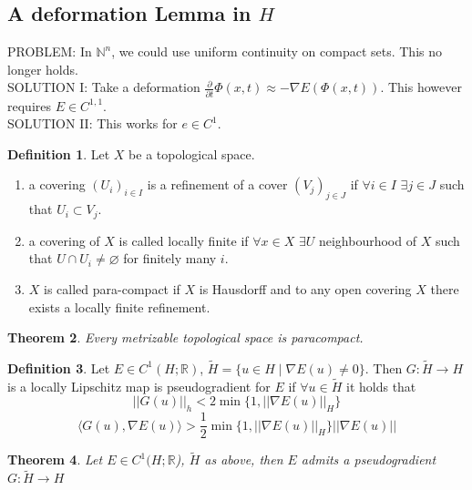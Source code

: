 \documentclass[a4paper, 12pt]{article}
\theoremstyle{plain}
\newtheorem{theorem}{Theorem}[section] %
\theoremstyle{definition}
\newtheorem{definition}[theorem]{Definition} %
\theoremstyle{lemma}
\theoremstyle{remark}
\theoremstyle{corollary}
\theoremstyle{example}
\begin{document}
	\subsection{A deformation Lemma in $H$}
	PROBLEM: In $\mathbb{N}^n$, we could use uniform continuity on compact sets. This no longer holds.\\
	SOLUTION I: Take a deformation $\frac{\partial}{\partial t} \Phi(x,t) \approx -\nabla E(\Phi(x,t))$. This however requires $E \in C^{1,1}$.\\
	SOLUTION II: This works for $e \in C^1$. 
	\begin{definition}
		Let $X$ be a topological space. \begin{enumerate}
			\item a covering $(U_i)_{i \in I}$ is a refinement of a cover $(V_j)_{j \in J}$ if $\forall i \in I$ $\exists j \in J$ such that $U_i \subset V_j$.
			\item a covering of $X$ is called locally finite if $\forall x \in X$ $\exists U$ neighbourhood of $X$ such that $U \cap U_i \neq \varnothing$ for finitely many $i$.
			\item $X$ is called para-compact if $X$ is Hausdorff and to any open covering $X$ there exists a locally finite refinement.
		\end{enumerate}
	\end{definition}
	\begin{theorem}
		Every metrizable topological space is paracompact.
	\end{theorem}
	\begin{definition}
		Let $E \in C^1(H;\mathbb{R})$, $\tilde{H} = \{u \in H \mid \nabla E(u) \neq 0\}$. Then $G: \tilde{H} \to H$ is a locally Lipschitz map is pseudogradient for $E$ if $\forall u \in \tilde{H}$ it holds that \[\left|\left|G(u)\right|\right|_h < 2 \min\{1,\left|\left|\nabla E(u)\right|\right|_H\}\]
		\[\langle G(u), \nabla E(u)\rangle > \frac{1}{2} \min\{1,\left|\left|\nabla E(u)\right|\right|_H\} \left|\left|\nabla E(u)\right|\right|\]
	\end{definition}
	\begin{theorem}
		Let $E \in C^1(H;\mathbb{R}$), $\tilde{H}$ as above, then $E$ admits a pseudogradient $G: \tilde{H} \to H$
	\end{theorem}
\end{document}
